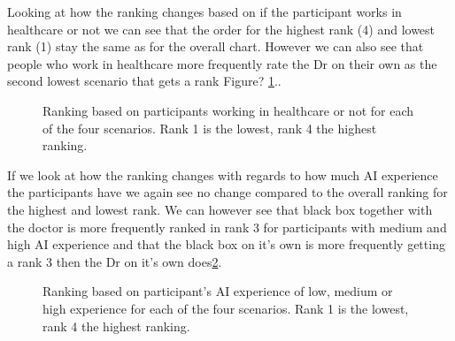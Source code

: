 \documentclass[manuscript,screen,review]{acmart}
\begin{document}
Looking at how the ranking changes based on if the participant works in healthcare or not we can see that the order for the highest rank (4) and lowest rank (1) stay the same as for the overall chart. However we can also see that people who work in healthcare more frequently rate the Dr on their own as the second lowest scenario that gets a rank Figure? \ref{fig:ranking-healthcare}..

\begin{figure}[H]
    \caption{Ranking based on participants working in healthcare or not for each of the four scenarios. Rank 1 is the lowest, rank 4 the highest ranking.}
    \label{fig:ranking-healthcare}
\end{figure}

If we look at how the ranking changes with regards to how much AI experience the participants have we again see no change compared to the overall ranking for the highest and lowest rank. We can however see that black box together with the doctor is more frequently ranked in rank 3 for participants with medium and high AI experience and that the black box on it's own is more frequently getting a rank 3 then the Dr on it's own does\ref{fig:ranking-ai}.

\begin{figure}[H]
    \caption{Ranking based on participant's AI experience of low, medium or high experience for each of the four scenarios. Rank 1 is the lowest, rank 4 the highest ranking.}
    \label{fig:ranking-ai}
\end{figure}
\end{document}
